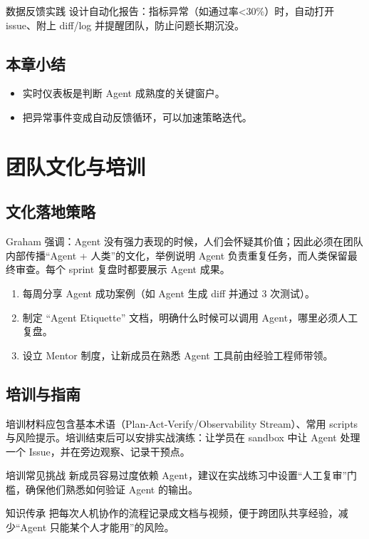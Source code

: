 \documentclass[a4paper]{article}
\begin{document}
\begin{importantbox}{数据反馈实践}
设计自动化报告：指标异常（如通过率<30\%）时，自动打开 issue、附上 diff/log 并提醒团队，防止问题长期沉没。
\end{importantbox}

\subsection{本章小结}
\begin{itemize}
    \item 实时仪表板是判断 Agent 成熟度的关键窗户。
    \item 把异常事件变成自动反馈循环，可以加速策略迭代。
\end{itemize}

\section{团队文化与培训}
\subsection{文化落地策略}
Graham 强调：Agent 没有强力表现的时候，人们会怀疑其价值；因此必须在团队内部传播“Agent + 人类”的文化，举例说明 Agent 负责重复任务，而人类保留最终审查。每个 sprint 复盘时都要展示 Agent 成果。

\begin{enumerate}
    \item 每周分享 Agent 成功案例（如 Agent 生成 diff 并通过 3 次测试）。
    \item 制定 “Agent Etiquette” 文档，明确什么时候可以调用 Agent，哪里必须人工复盘。
    \item 设立 Mentor 制度，让新成员在熟悉 Agent 工具前由经验工程师带领。
\end{enumerate}

\subsection{培训与指南}
培训材料应包含基本术语（Plan-Act-Verify/Observability Stream）、常用 scripts 与风险提示。培训结束后可以安排实战演练：让学员在 sandbox 中让 Agent 处理一个 Issue，并在旁边观察、记录干预点。

\begin{warningbox}{培训常见挑战}
新成员容易过度依赖 Agent，建议在实战练习中设置“人工复审”门槛，确保他们熟悉如何验证 Agent 的输出。
\end{warningbox}

\begin{knowledgebox}{知识传承}
把每次人机协作的流程记录成文档与视频，便于跨团队共享经验，减少“Agent 只能某个人才能用”的风险。
\end{knowledgebox}
\end{document}
